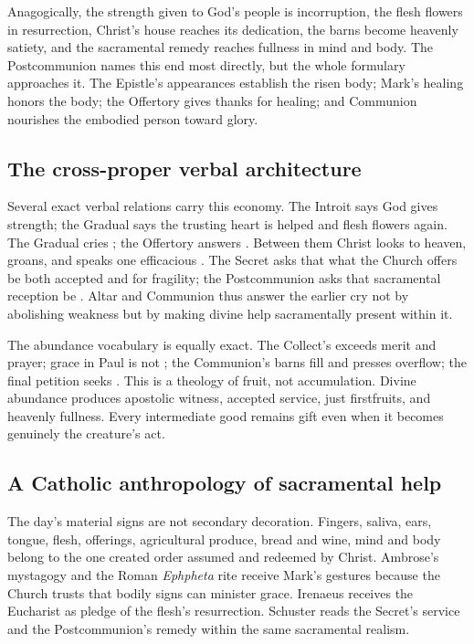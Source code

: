 Anagogically, the strength given to God's people is incorruption, the flesh
flowers in resurrection, Christ's house reaches its dedication, the barns
become heavenly satiety, and the sacramental remedy reaches fullness in mind
and body. The Postcommunion names this end most directly, but the whole
formulary approaches it. The Epistle's appearances establish the risen body;
Mark's healing honors the body; the Offertory gives thanks for healing; and
Communion nourishes the embodied person toward glory.

\subsection*{The cross-proper verbal architecture}

Several exact verbal relations carry this economy. The Introit says God gives
strength; the Gradual says the trusting heart is helped and flesh flowers
again. The Gradual cries ; the Offertory answers
. Between them Christ looks to
heaven, groans, and speaks one efficacious . The Secret asks
that what the Church offers be both accepted  and
 for fragility; the Postcommunion asks that sacramental
reception be . Altar and Communion thus
answer the earlier cry not by abolishing weakness but by making divine help
sacramentally present within it.

The abundance vocabulary is equally exact. The Collect's
 exceeds merit and prayer; grace in Paul is not
; the Communion's barns fill and presses overflow; the final
petition seeks . This is a theology of fruit,
not accumulation. Divine abundance produces apostolic witness, accepted
service, just firstfruits, and heavenly fullness. Every intermediate good
remains gift even when it becomes genuinely the creature's act.

\subsection*{A Catholic anthropology of sacramental help}

The day's material signs are not secondary decoration. Fingers, saliva, ears,
tongue, flesh, offerings, agricultural produce, bread and wine, mind and body
belong to the one created order assumed and redeemed by Christ. Ambrose's
mystagogy and the Roman \emph{Ephpheta} rite receive Mark's gestures because
the Church trusts that bodily signs can minister grace. Irenaeus receives the
Eucharist as pledge of the flesh's resurrection. Schuster reads the Secret's
service and the Postcommunion's remedy within the same sacramental realism.

